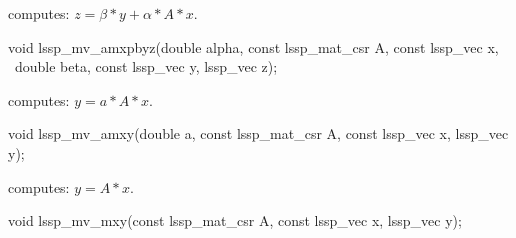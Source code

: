 computes: $z = \beta * y + \alpha * A * x$.
\begin{evb}
void lssp_mv_amxpbyz(double alpha, const lssp_mat_csr A, const lssp_vec x, \
    double beta, const lssp_vec y, lssp_vec z);
\end{evb}

 computes: $y = a * A * x$.
\begin{evb}
void lssp_mv_amxy(double a, const lssp_mat_csr A, const lssp_vec x, lssp_vec y);
\end{evb}

 computes: $y = A * x$.
\begin{evb}
void lssp_mv_mxy(const lssp_mat_csr A, const lssp_vec x,  lssp_vec y);
\end{evb}
